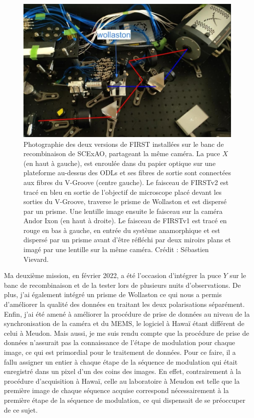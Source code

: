 \begin{figure}[ht!]
    \centering
    \includegraphics[width=\figwidth]{Figure_Chap5/20220201_Subaru_V1V2.jpeg}
    \caption[Photographie des deux versions de FIRST installées sur le banc de recombinaison de SCExAO, partageant la même caméra.]{Photographie des deux versions de FIRST installées sur le banc de recombinaison de SCExAO, partageant la même caméra. La puce $X$ (en haut à gauche), est enroulée dans du papier optique sur une plateforme au-dessus des ODLs et ses fibres de sortie sont connectées aux fibres du V-Groove (centre gauche). Le faisceau de FIRSTv2 est tracé en bleu en sortie de l'objectif de microscope placé devant les sorties du V-Groove, traverse le prisme de Wollaston et est dispersé par un prisme. Une lentille image ensuite le faisceau sur la caméra Andor Ixon (en haut à droite). Le faisceau de FIRSTv1 est tracé en rouge en bas à gauche, en entrée du système anamorphique et est dispersé par un prisme avant d'être réfléchi par deux miroirs plans et imagé par une lentille sur la même caméra. Crédit : Sébastien Vievard.}
    \label{fig:FIRSTV1V2IxonPhoto}
\end{figure}

Ma deuxième mission, en février 2022, a été l'occasion d'intégrer la puce $Y$ sur le banc de recombinaison et de la tester lors de plusieurs nuits d'observations. De plus, j'ai également intégré un prisme de Wollaston ce qui nous a permis d'améliorer la qualité des données en traitant les deux polarisations séparément. Enfin, j'ai été amené à améliorer la procédure de prise de données au niveau de la synchronisation de la caméra et du \ac{MEMS}, le logiciel à Hawaï étant différent de celui à Meudon. Mais aussi, je me suis rendu compte que la procédure de prise de données n'assurait pas la connaissance de l'étape de modulation pour chaque image, ce qui est primordial pour le traitement de données. Pour ce faire, il a fallu assigner un entier à chaque étape de la séquence de modulation qui était enregistré dans un pixel d'un des coins des images. En effet, contrairement à la procédure d'acquisition à Hawaï, celle au laboratoire à Meudon est telle que la première image de chaque séquence acquise correspond nécessairement à la première étape de la séquence de modulation, ce qui dispensait de se préoccuper de ce sujet.



